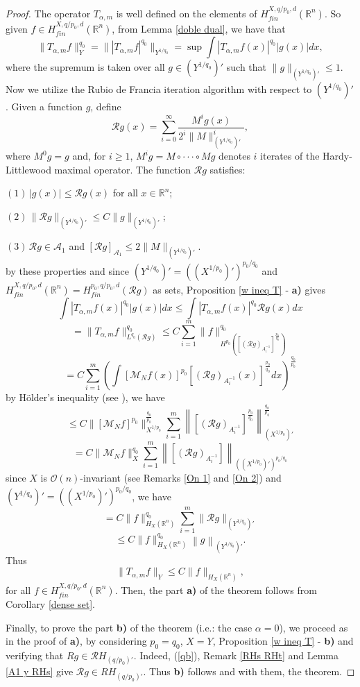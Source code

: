\documentclass[oneside,10pt]{article}
\begin{document}
\begin{proof} The operator $T_{\alpha, m}$ is well defined on the elements of $H^{X, q/p_0, d}_{fin}(\mathbb{R}^{n})$. So given 
$f \in H^{X, q/p_0, d}_{fin}(\mathbb{R}^{n})$, from Lemma \ref{doble dual}, we have that
\[
\| T_{\alpha, m} f\|_{Y}^{q_0} = \| |T_{\alpha, m} f|^{q_0} \|_{Y^{1/q_0}} = \sup \int |T_{\alpha, m} f(x)|^{q_0} |g (x)| dx,
\]
where the supremum is taken over all $g \in (Y^{1/q_0})'$ such that $\| g \|_{(Y^{1/q_0})'} \leq 1$.
Now we utilize the Rubio de Francia iteration algorithm with respect to $(Y^{1/q_0})'$. Given a function $g$, define
\[
\mathcal{R}g (x) = \sum_{i=0}^{\infty} \frac{M^{i}g(x)}{2^{i} \|M\|_{(Y^{1/q_0})'}^{i}},
\]
where $M^{0}g = g$ and, for $i \geq 1$, $M^{i}g = M \circ \cdot \cdot \cdot \circ M g$ denotes $i$ iterates of the Hardy-Littlewood maximal operator. The function $\mathcal{R}g$ satisfies:

$(1) \, |g(x)| \leq \mathcal{R}g(x)$ for all $x \in \mathbb{R}^{n}$;

$(2) \, \| \mathcal{R}g \|_{(Y^{1/q_0})'} \leq C \|g \|_{(Y^{1/q_0})'}$;

$(3) \, \mathcal{R}g \in \mathcal{A}_1$ and $[\mathcal{R}g]_{\mathcal{A}_1} \leq 2 \| M\|_{(Y^{1/q_0})'}$.\\
by these properties and since $(Y^{1/q_0})' = ((X^{1/p_0})')^{p_0/q_0}$ and 
$H^{X, q/p_0, d}_{fin}(\mathbb{R}^{n}) = H^{p_0, q/p_0, d}_{fin}(\mathcal{R}g)$ as sets, Proposition \ref{w ineq T} - \textbf{a)} gives
\[
\int |T_{\alpha, m} f(x)|^{q_0} |g (x)| dx \leq \int |T_{\alpha, m} f(x)|^{q_0} \mathcal{R}g(x) dx
\]
\[
= \| T_{\alpha, m}f \|_{L^{q_0}(\mathcal{R}g)}^{q_0}
\leq C \sum_{i=1}^{m} \|f \|_{H^{p_0}\left([(\mathcal{R}g)_{A_{i}^{-1}}]^{\frac{p_0}{q_0}} \right)}^{q_0}
\]
\[
=C  \sum_{i=1}^{m} \left( \int [\mathcal{M}_{N}f(x)]^{p_0} [(\mathcal{R}g)_{A_{i}^{-1}}(x)]^{\frac{p_0}{q_0}} dx \right)^{\frac{q_0}{p_0}}
\]
by H\"older's inequality (see \cite[Lemma 2.5]{Zhang}), we have
\[
\leq C \| [\mathcal{M}_{N}f]^{p_0} \|_{X^{1/p_0}}^{\frac{q_0}{p_0}} \sum_{i=1}^{m}\left\|[(\mathcal{R}g)_{A_{i}^{-1}}]^{\frac{p_0}{q_0}} \right\|_{(X^{1/p_0})'}^{\frac{q_0}{p_0}}
\]
\[
= C \| \mathcal{M}_{N}f \|_{X}^{q_0} \sum_{i=1}^{m}\left\|[(\mathcal{R}g)_{A_{i}^{-1}}] 
\right\|_{((X^{1/p_0})')^{p_0/q_0}}
\]
since $X$ is $\mathcal{O}(n)$-invariant (see Remarks \ref{On 1} and \ref{On 2}) and $(Y^{1/q_0})' = ((X^{1/p_0})')^{p_0/q_0}$, we have
\[
= C \| f \|_{H_X(\mathbb{R}^n)}^{q_0} \sum_{i=1}^{m} \|\mathcal{R}g\|_{(Y^{1/q_0})'}
\]
\[
\leq  C \|f \|_{H_X(\mathbb{R}^n)}^{q_0} \left\|g \right\|_{(Y^{1/q_0})'}.
\]
Thus
\[
\| T_{\alpha, m} f\|_{Y} \leq C \|f \|_{H_X(\mathbb{R}^n)},
\]
for all $f \in H^{X, q/p_0, d}_{fin}(\mathbb{R}^{n})$. Then, the part \textbf{a)} of the theorem follows from Corollary \ref{dense set}. 

Finally, to prove the part \textbf{b)} of the theorem (i.e.: the case $\alpha = 0$), we proceed as in the proof of \textbf{a)}, by considering $p_0=q_0$, $X = Y$, Proposition \ref{w ineq T} - \textbf{b)} and verifying that $Rg \in \mathcal RH_{(q/p_0)'}$. Indeed, (\ref{qb}), Remark \ref{RHs RHt} and Lemma \ref{A1 y RHs} give $\mathcal{R}g \in RH_{(q/p_0)'}$. Thus \textbf{b)} follows and with them, the theorem.
\end{proof}
\end{document}
